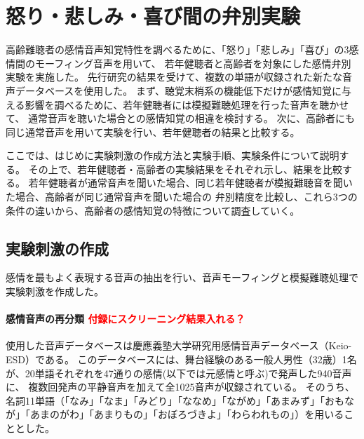 \newpage
\chapter{怒り・悲しみ・喜び間の弁別実験}
\label{chap:ExpAngHapSad}

高齢難聴者の感情音声知覚特性を調べるために、「怒り」「悲しみ」「喜び」の3感情間のモーフィング音声を用いて、
若年健聴者と高齢者を対象にした感情弁別実験を実施した。
先行研究\cite{hanatani2023Emo}の結果を受けて、複数の単語が収録された新たな音声データベース\cite{keioESD-J}を使用した。
まず、聴覚末梢系の機能低下だけが感情知覚に与える影響を調べるために、若年健聴者には模擬難聴処理を行った音声を聴かせて、
通常音声を聴いた場合との感情知覚の相違を検討する。
次に、高齢者にも同じ通常音声を用いて実験を行い、若年健聴者の結果と比較する。

ここでは、はじめに実験刺激の作成方法と実験手順、実験条件について説明する。
その上で、若年健聴者・高齢者の実験結果をそれぞれ示し、結果を比較する。
若年健聴者が通常音声を聞いた場合、同じ若年健聴者が模擬難聴音を聞いた場合、高齢者が同じ通常音声を聞いた場合の
弁別精度を比較し、これら3つの条件の違いから、高齢者の感情知覚の特徴について調査していく。

\section{実験刺激の作成}
\label{sec:PrepareStimuli}
感情を最もよく表現する音声の抽出を行い、音声モーフィングと模擬難聴処理で実験刺激を作成した。

\subsubsection{感情音声の再分類 \textcolor{red}{付録にスクリーニング結果入れる？}}
使用した音声データベースは慶應義塾大学研究用感情音声データベース（Keio-ESD）\cite{keioESD-J}である。
このデータベースには、舞台経験のある一般人男性（32歳）1名が、20単語それぞれを47通りの感情(以下では元感情と呼ぶ)で発声した940音声に、
複数回発声の平静音声を加えて全1025音声が収録されている。
そのうち、名詞11単語（「なみ」「なま」「みどり」「ななめ」「ながめ」「あまみず」「おもなが」「あまのがわ」「あまりもの」「おぼろづきよ」「わらわれもの」）を用いることとした。

